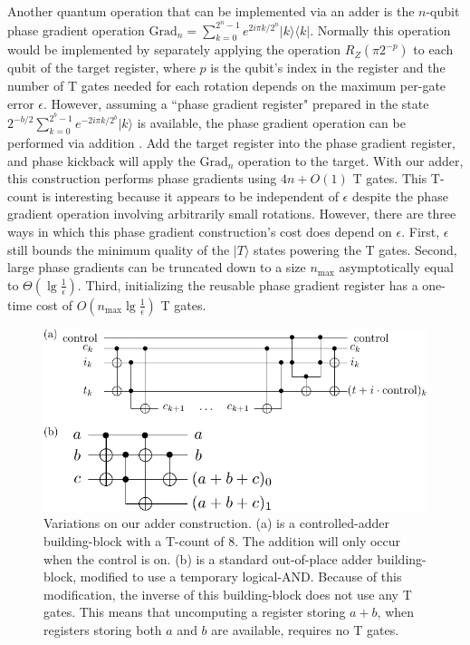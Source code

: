\documentclass[twocolumn]{quantumarticle-customized}
\begin{document}
Another quantum operation that can be implemented via an adder is the $n$-qubit phase gradient operation $\text{Grad}_n = \sum_{k=0}^{2^n-1} e^{2 i \pi k / 2^n} |k\rangle \langle k|$.
Normally this operation would be implemented by separately applying the operation $R_Z(\pi 2^{-p})$ to each qubit of the target register, where $p$ is the qubit's index in the register and the number of T gates needed for each rotation depends on the maximum per-gate error $\epsilon$.
However, assuming a ``phase gradient register" prepared in the state $2^{-b/2} \sum_{k=0}^{2^b-1} e^{-2 i \pi k / 2^b} |k\rangle$ is available, the phase gradient operation can be performed via addition \cite{Kitaev2002}.
Add the target register into the phase gradient register, and phase kickback will apply the $\text{Grad}_n$ operation to the target.
With our adder, this construction performs phase gradients using $4n + O(1)$ T gates.
This T-count is interesting because it appears to be independent of $\epsilon$ despite the phase gradient operation involving arbitrarily small rotations.
However, there are three ways in which this phase gradient construction's cost does depend on $\epsilon$.
First, $\epsilon$ still bounds the minimum quality of the $|T\rangle$ states powering the T gates.
Second, large phase gradients can be truncated down to a size $n_{\text{max}}$ asymptotically equal to $\Theta(\lg \frac{1}{\epsilon})$.
Third, initializing the reusable phase gradient register has a one-time cost of $O(n_{\text{max}} \lg \frac{1}{\epsilon})$ T gates.

\begin{figure}
  \includegraphics[width=\linewidth]{other-adder-building-blocks.pdf}
  \caption{
	Variations on our adder construction.
	(a) is a controlled-adder building-block with a T-count of 8.
	The addition will only occur when the control is on.
	(b) is a standard out-of-place adder building-block, modified to use a temporary logical-AND.
	Because of this modification, the inverse of this building-block does not use any T gates.
	This means that uncomputing a register storing $a+b$, when registers storing both $a$ and $b$ are available, requires no T gates.
  }
  \label{fig:other-adder-building-blocks}
\end{figure}
\end{document}
